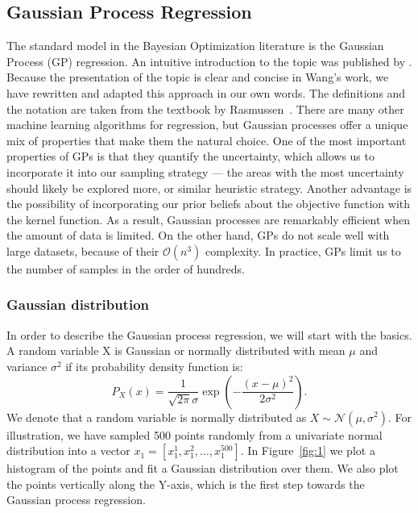 \subsection{Gaussian Process Regression}
The standard model in the Bayesian Optimization literature is the Gaussian Process (GP) regression. An intuitive introduction to the topic was published by \citet{wang2023intuitive}. Because the presentation of the topic is clear and concise in Wang's work, we have rewritten and adapted this approach in our own words. The definitions and the notation are taken from the textbook by Rasmussen~\cite{rasmussen2006gaussian}. There are many other machine learning algorithms for regression, but Gaussian processes offer a unique mix of properties that make them the natural choice. One of the most important properties of GPs is that they quantify the uncertainty, which allows us to incorporate it into our sampling strategy --- the areas with the most uncertainty should likely be explored more, or similar heuristic strategy. Another advantage is the possibility of incorporating our prior beliefs about the objective function with the kernel function. As a result, Gaussian processes are remarkably efficient when the amount of data is limited. On the other hand, GPs do not scale well with large datasets, because of their $\mathcal{O}(n^3)$ complexity. In practice, GPs limit us to the number of samples in the order of hundreds.

\subsubsection{Gaussian distribution}
In order to describe the Gaussian process regression, we will start with the basics. A random variable X is Gaussian or normally distributed with mean $\mu$ and variance $\sigma^2$ if its probability density function is: \[ P_X(x) = \frac{1}{\sqrt{2\pi} \sigma} \exp\left(-\frac{(x-\mu)^2}{2 \sigma^2}\right). \] We denote that a random variable is normally distributed as $X \sim \mathcal{N}(\mu, \sigma^2)$. For illustration, we have sampled 500 points randomly from a univariate normal distribution into a vector $x_1 =[x_1^1,x_1^2, \ldots,x_1^{500}]$. In Figure~\ref{fig:1} we plot a histogram of the points and fit a Gaussian distribution over them. We also plot the points vertically along the Y-axis, which is the first step towards the Gaussian process regression.

